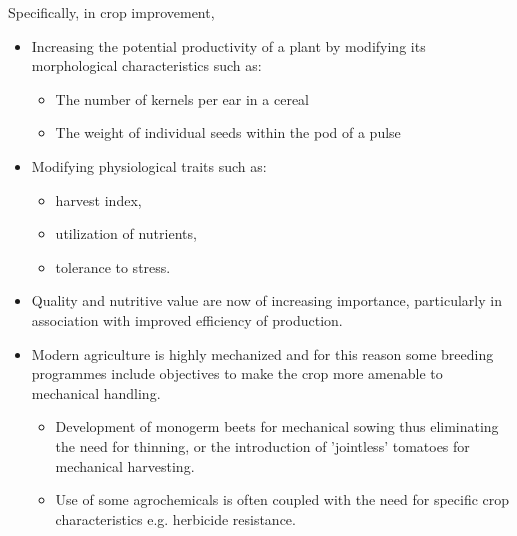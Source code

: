\documentclass[11pt,ignorenonframetext,aspectratio=169]{beamer}
\providecommand{\tightlist}{%
  \setlength{\itemsep}{0pt}\setlength{\parskip}{0pt}}
\begin{document}
\begin{frame}{Specifically, in crop improvement,}
\protect\hypertarget{specifically-in-crop-improvement}{}
\small

\begin{itemize}
\tightlist
\item
  Increasing the potential productivity of a plant by modifying its
  morphological characteristics such as:

  \begin{itemize}
  \footnotesize
  \item The number of kernels per ear in a cereal
  \item The weight of individual seeds within the pod of a pulse
  \end{itemize}
\item
  Modifying physiological traits such as:

  \begin{itemize}
  \footnotesize
  \item harvest index, 
  \item utilization of nutrients,
  \item tolerance to stress.
  \end{itemize}
\item
  Quality and nutritive value are now of increasing importance,
  particularly in association with improved efficiency of production.
\item
  Modern agriculture is highly mechanized and for this reason some
  breeding programmes include objectives to make the crop more amenable
  to mechanical handling.

  \begin{itemize}
  \footnotesize
  \item Development of monogerm beets for mechanical sowing thus eliminating the need for thinning, or the introduction of 'jointless' tomatoes for mechanical harvesting. 
  \item Use of some agrochemicals is often coupled with the need for specific crop characteristics e.g. herbicide resistance.
  \end{itemize}
\end{itemize}
\end{frame}
\end{document}
